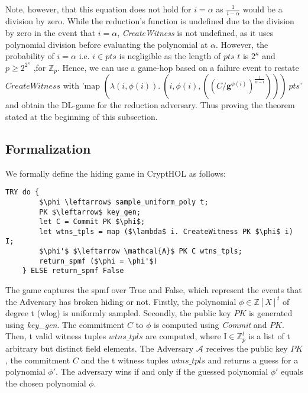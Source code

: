 Note, however, that this equation does not hold for  $i=\alpha$ as $\frac{1}{i-\alpha}$ would be a division by zero. While the reduction's function is undefined due to the division by zero in the event that $i=\alpha$,  \textit{CreateWitness} is not undefined, as it uses polynomial division before evaluating the polynomial at $\alpha$.
However, the probability of $i=\alpha$ i.e. $i\in pts$ is negligible as the length of $pts$ $t$ is $2^\kappa$ and $p\ge 2^{2^\kappa}$ ,for $\mathbb{Z}_p$. Hence, we can use a game-hop based on a failure event to restate $CreateWitness$ with '$\text{map } (\lambda (i,\phi(i)).\ (i,\phi(i), ((C/\mathbf{g}^{\phi(i)})^{\frac{1}{\alpha-i}})))\ pts$' and obtain the DL-game for the reduction adversary. Thus proving the theorem stated at the beginning of this subsection.

 
\subsection{Formalization}
\label{security:hiding:formalization}
We formally define the hiding game in CryptHOL as follows:
\begin{lstlisting}[language=isabelle]
    TRY do {
        $\phi \leftarrow$ sample_uniform_poly t;
        PK $\leftarrow$ key_gen;
        let C = Commit PK $\phi$;
        let wtns_tpls = map ($\lambda$ i. CreateWitness PK $\phi$ i) I;
        $\phi'$ $\leftarrow \mathcal{A}$ PK C wtns_tpls;
        return_spmf ($\phi = \phi'$)
    } ELSE return_spmf False
\end{lstlisting}
The game captures the spmf over True and False, which represent the events that the Adversary has broken hiding or not.
Firstly, the polynomial $\phi\in\mathbb{Z}[X]^t$ of degree t (wlog) is uniformly sampled.
Secondly, the public key $PK$ is generated using \textit{key\_gen}. 
The commitment $C$ to $\phi$ is computed using \textit{Commit} and $PK$. Then, t valid witness tuples $wtns\_tpls$ are computed, where $\text{I}\in\mathbb{Z}_p^t$ is a list of t arbitrary but distinct field elements.
The Adversary $\mathcal{A}$ receives the public key $PK$, the commitment $C$ and the t witness tuples $wtns\_tpls$ and returns a guess for a polynomial $\phi'$.
The adversary wins if and only if the guessed polynomial $\phi'$ equals the chosen polynomial $\phi$.

